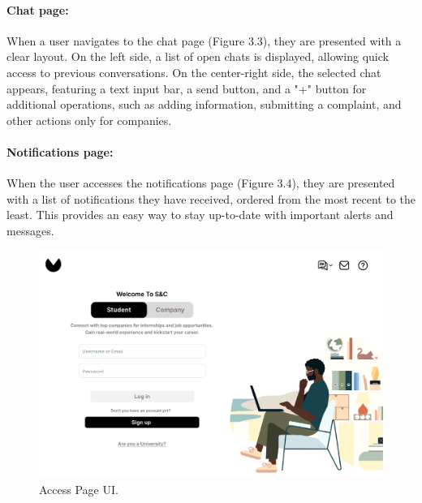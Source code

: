 \paragraph{Chat page:} When a user navigates to the chat page (Figure 3.3), they are presented with a clear layout. On the left side, a list of open chats is displayed, allowing quick access to previous conversations. On the center-right side, the selected chat appears, featuring a text input bar, a send button, and a "+" button for additional operations, such as adding information, submitting a complaint, and other actions only for companies.


\paragraph{Notifications page:} When the user accesses the notifications page (Figure 3.4), they are presented with a list of notifications they have received, ordered from the most recent to the least. This provides an easy way to stay up-to-date with important alerts and messages.


\begin{figure}[H]
    \begin{center}
        \includegraphics[width=\linewidth]{Images/UserInterfaces/AccessPage.pdf}
        \caption{Access Page UI.}
        \label{fig:access_page_UI}%
    \end{center}
\end{figure}

